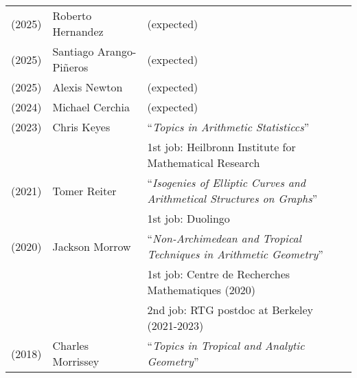 \documentclass[margin,line]{res}
\newcommand{\defi}[1]{\textsf{#1}} 				%
\begin{document}
\begin{resume}
\begin{tabular}{lll}
  (2025) & \defi{Roberto Hernandez} & (expected)
    \vspace{4pt}\\    
  (2025) & \defi{Santiago Arango-Pi\~neros} & (expected)
    \vspace{4pt}\\  
  (2025) & \defi{Alexis Newton} & (expected)
    \vspace{4pt}\\
  (2024) & \defi{Michael Cerchia} & (expected)
    \vspace{4pt}\\
  (2023) & \defi{Chris Keyes} &  ``\emph{Topics in Arithmetic Statisticcs}'' \\
         && \hspace{4 pt} 1st job: Heilbronn Institute for Mathematical Research
         \vspace{4pt}\\
  (2021) & \defi{Tomer Reiter} &  ``\emph{Isogenies of Elliptic Curves and Arithmetical Structures on Graphs}'' \\
         && \hspace{4 pt} 1st job: Duolingo 
    \vspace{4pt}\\ 
  (2020) & \defi{Jackson Morrow} &  ``\emph{Non-Archimedean and Tropical Techniques in Arithmetic Geometry}'' \\
         && \hspace{4 pt} 1st job: Centre de Recherches Mathematiques (2020)\\
         &&  \hspace{4 pt} 2nd job: RTG postdoc at Berkeley (2021-2023)
    \vspace{4pt}\\
  (2018) & \defi{Charles Morrissey} &   ``\emph{Topics in Tropical and Analytic Geometry}'' \\

\end{tabular}
\end{resume}
\end{document}
